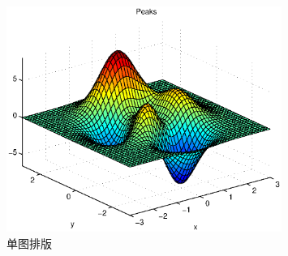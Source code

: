 \documentclass{article}
\begin{document}
    \begin{figure}[!htbp]
        \centering
        \includegraphics[width=0.8\textwidth]{example}
        \caption{单图排版}
    \end{figure}
\end{document}
